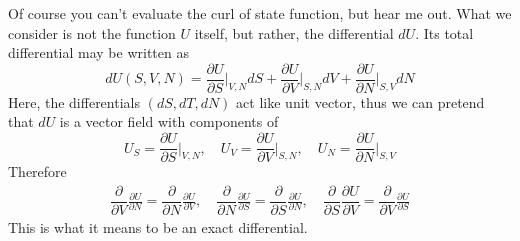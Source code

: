 \documentclass[../../../main.tex]{subfiles}
\begin{document}
Of course you can't evaluate the curl of state function, but hear me out. What we consider is not the function $U$ itself, but rather, the differential $dU$. Its total differential may be written as
\begin{equation*}
    dU(S,V,N)=\frac{\partial U}{\partial S}\bigg|_{V,N} dS + \frac{ \partial U}{\partial V}\bigg|_{S,N} dV+ \frac{\partial U}{\partial N}\bigg|_{S,V}dN
\end{equation*}
Here, the differentials $(dS,dT,dN)$ act like unit vector, thus we can pretend that $dU$ is a vector field with components of
\begin{equation*}
    U_S=\frac{\partial U}{\partial S}\bigg|_{V,N}, \quad
    U_V=\frac{ \partial U}{\partial V}\bigg|_{S,N},\quad
    U_N=\frac{\partial U}{\partial N}\bigg|_{S,V}
\end{equation*}
Therefore
\begin{align*}
    \dfrac{\partial }{\partial V} \frac{\partial U}{\partial N}  = \dfrac{\partial }{\partial N}\frac{ \partial U}{\partial V},\quad
    \dfrac{\partial }{\partial N}\frac{\partial U}{\partial S}=\dfrac{\partial }{\partial S}\frac{\partial U}{\partial N},\quad
    \dfrac{\partial }{\partial S}\dfrac{ \partial U}{\partial V}=\dfrac{\partial }{\partial V}\frac{\partial U}{\partial S}
\end{align*}
This is what it means to be an exact differential.
\end{document}
